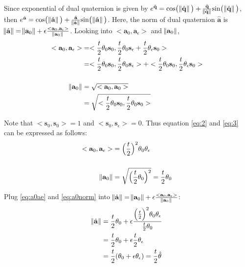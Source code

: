 \documentclass[paper=a4, fontsize=11pt]{scrartcl} %
\numberwithin{equation}{section} %
\numberwithin{figure}{section} %
\numberwithin{table}{section} %
\renewcommand{\vec}[1]{\mathbf{#1}}
\begin{document}
\begin{itemize}
	Since exponential of dual quaternion is given by $e^{\hat{\vec{q}}} = \text{cos} \big( \norm{\hat{\vec{q}}} \big) + \frac{\hat{\vec{q}}}{\norm{\hat{\vec{q}}}} \text{sin} \big( \norm{\hat{\vec{q}}} \big)$, then $e^{\hat{\vec{a}}} = \text{cos} \big( \norm{\hat{\vec{a}}} \big) + \frac{\hat{\vec{a}}}{\norm{\hat{\vec{a}}}} \text{sin} \big( \norm{\hat{\vec{a}}} \big)$. Here, the norm of dual quaternion $\hat{\vec{a}}$ is $\norm{\hat{\vec{a}}} = \norm{\vec{a}_0} + \epsilon \frac{<\vec{a}_0, \vec{a}_\epsilon>}{\norm{\vec{a}_0}}$. Looking into $<\vec{a}_0, \vec{a}_\epsilon>$ and $\norm{\vec{a}_0}$,
	\begin{align}
		<\vec{a}_0, \vec{a}_\epsilon> &= <\frac{t}{2} \theta_0\vec{s}_0, \frac{t}{2} \theta_0 \vec{s}_\epsilon + \frac{t}{2} \theta_\epsilon \vec{s}_0> \\
		&= <\frac{t}{2} \theta_0\vec{s}_0, \frac{t}{2} \theta_0 \vec{s}_\epsilon> + <\frac{t}{2} \theta_0\vec{s}_0, \frac{t}{2} \theta_\epsilon \vec{s}_0> \label{eq:2}  \\[0.5cm] 
		\norm{\vec{a}_0} &= \sqrt{<\vec{a}_0, \vec{a}_0>} \\
		&= \sqrt{<\frac{t}{2} \theta_0 \vec{s}_0, \frac{t}{2} \theta_0 \vec{s}_0>} \label{eq:3} 
	\end{align}
	
	Note that $<\vec{s}_0, \vec{s}_0> = 1$ and $<\vec{s}_0, \vec{s}_\epsilon> = 0$. Thus equation \ref{eq:2} and \ref{eq:3} can be expressed as follows: 
	\begin{align}
		<\vec{a}_0, \vec{a}_\epsilon> &= \Big(\frac{t}{2}\Big)^2 \theta_0 \theta_\epsilon \label{eq:a0ae} \\[0.5cm]
		\norm{\vec{a}_0} &= \sqrt{\Big(\frac{t}{2} \theta_0 \Big)^2} = \frac{t}{2} \theta_0 \label{eq:a0norm} 
	\end{align}
	
	Plug \ref{eq:a0ae} and \ref{eq:a0norm} into $\norm{\hat{\vec{a}}} = \norm{\vec{a}_0} + \epsilon \frac{<\vec{a}_0, \vec{a}_\epsilon>}{\norm{\vec{a}_0}}$:
	\begin{align}
		\norm{\hat{\vec{a}}} &= \frac{t}{2} \theta_0 + \epsilon \frac{\Big(\frac{t}{2}\Big)^2 \theta_0 \theta_\epsilon}{\frac{t}{2} \theta_0}	\\
		&= \frac{t}{2} \theta_0 + \epsilon \frac{t}{2} \theta_\epsilon \\
		&= \frac{t}{2} (\theta_0 + \epsilon \theta_\epsilon) = \frac{t}{2} \hat{\theta} \label{eq:anorm}
	\end{align}
	

\end{itemize}
\end{document}
